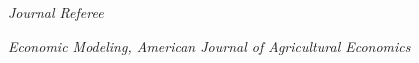 \documentclass[10pt]{article}
\renewcommand{\section}[2]%
        {\pagebreak[3]\vspace{1.3\baselineskip}%
         \phantomsection\addcontentsline{toc}{section}{#1}%
         \hspace{0in}%
         \marginpar{
         \raggedright \scshape #1}#2}
\newcommand{\halfblankline}{\quad\vspace{-0.5\baselineskip}\pagebreak[3]}
\begin{document}
\halfblankline


\textit{Journal Referee}

\textit{Economic Modeling, American Journal of Agricultural Economics} 

\halfblankline
















\end{document}
